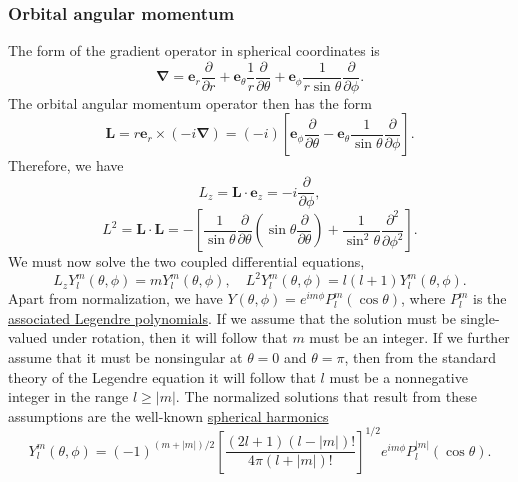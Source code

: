 \subsubsection{Orbital angular momentum}
The form of the gradient operator in spherical coordinates is
\[\bm{\nabla} = \bm{e}_r \frac{\partial}{\partial r} + \bm{e}_{\theta} \frac{1}{r} \frac{\partial}{\partial \theta} + \bm{e}_{\phi} \frac{1}{r\sin\theta} \frac{\partial}{\partial \phi}.\]
The orbital angular momentum operator then has the form
\[\bm{L} = r\bm{e}_r \times (-i\bm{\nabla}) = (-i) \left[ \bm{e}_{\phi} \frac{\partial}{\partial \theta} - \bm{e}_{\theta} \frac{1}{\sin\theta} \frac{\partial}{\partial \phi} \right].\]
Therefore, we have
\[L_z = \bm{L}\cdot\bm{e}_z = -i\frac{\partial}{\partial \phi},\]
\[L^2 = \bm{L}\cdot\bm{L} = - \left [ \frac{1}{\sin\theta} \frac{\partial }{\partial \theta} (\sin\theta \frac{\partial }{\partial \theta}) + \frac{1}{\sin^2\theta} \frac{\partial^2}{\partial \phi^2}  \right ].\]
We must now solve the two coupled differential equations,
\[L_z Y_l^m(\theta,\phi) = m Y_l^m(\theta,\phi) , \quad L^2 Y_l^m(\theta,\phi) = l(l+1) Y_l^m(\theta,\phi).\]
Apart from normalization, we have $Y(\theta,\phi) = e^{im\phi}P_l^m(\cos\theta)$, where $P_l^m$ is the \href{https://en.wikipedia.org/wiki/Associated_Legendre_polynomials}{associated Legendre polynomials}. If we assume that the solution must be single-valued under rotation, then it will follow that $m$ must be an integer. If we further assume that it must be nonsingular at $\theta = 0$ and $\theta = \pi$, then from the standard theory of the Legendre equation it will follow that $l$ must be a nonnegative integer in the range $l \geq |m|$. The normalized solutions that result from these assumptions are the well-known \href{https://en.wikipedia.org/wiki/Spherical_harmonics}{spherical harmonics}
\[Y_l^m(\theta,\phi) = (-1)^{(m+|m|)/2} \left [\frac{(2l+1)(l-|m|)!}{4\pi(l+|m|)!}  \right ]^{1/2}e^{im\phi} P_l^{|m|}(\cos\theta).\]

